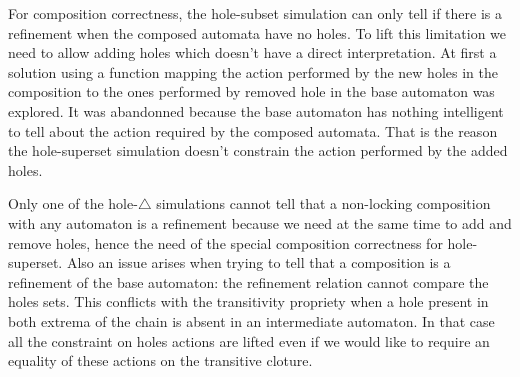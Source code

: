 \documentclass{article}
\begin{document}
For composition correctness, the hole-subset simulation can only tell if there is a refinement when the composed automata have no holes.
To lift this limitation we need to allow adding holes which doesn't have a direct interpretation.
At first a solution using a function mapping the action performed by the new holes in the composition to the ones performed by removed hole in the base automaton was explored.
It was abandonned because the base automaton has nothing intelligent to tell about the action required by the composed automata.
That is the reason the hole-superset simulation doesn't constrain the action performed by the added holes.

Only one of the hole-\(\triangle\) simulations cannot tell that a non-locking composition with any automaton is a refinement because we need at the same time to add and remove holes, hence the need of the special composition correctness for hole-superset.
Also an issue arises when trying to tell that a composition is a refinement of the base automaton: the refinement relation cannot compare the holes sets.
This conflicts with the transitivity propriety when a hole present in both extrema of the chain is absent in an intermediate automaton.
In that case all the constraint on holes actions are lifted even if we would like to require an equality of these actions on the transitive cloture.
\end{document}
